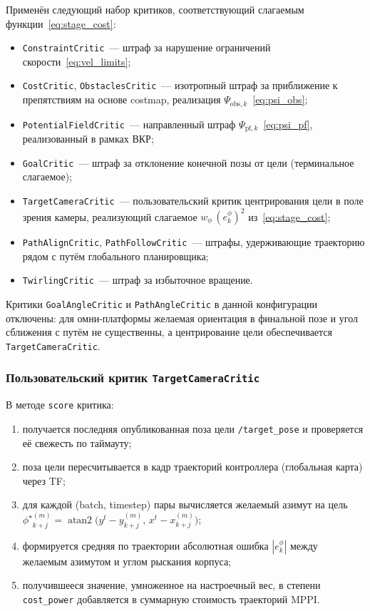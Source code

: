 Применён следующий набор критиков, соответствующий слагаемым
функции~\eqref{eq:stage_cost}:
\begin{itemize}
    \item \texttt{ConstraintCritic}~--- штраф за нарушение ограничений
          скорости~\eqref{eq:vel_limits};
    \item \texttt{CostCritic}, \texttt{ObstaclesCritic}~--- изотропный штраф
          за приближение к препятствиям на основе costmap, реализация
          $\Psi_{\text{obs},k}$~\eqref{eq:psi_obs};
    \item \texttt{PotentialFieldCritic}~--- направленный штраф
          $\Psi_{\text{pf},k}$~\eqref{eq:psi_pf}, реализованный в
          рамках ВКР;
    \item \texttt{GoalCritic}~--- штраф за отклонение конечной позы от
          цели (терминальное слагаемое);
    \item \texttt{TargetCameraCritic}~--- пользовательский критик
          центрирования цели в поле зрения камеры, реализующий
          слагаемое $w_{\phi}\,(e^{\phi}_k)^{2}$ из~\eqref{eq:stage_cost};
    \item \texttt{PathAlignCritic}, \texttt{PathFollowCritic}~--- штрафы,
          удерживающие траекторию рядом с путём глобального планировщика;
    \item \texttt{TwirlingCritic}~--- штраф за избыточное вращение.
\end{itemize}

Критики \texttt{GoalAngleCritic} и \texttt{PathAngleCritic} в данной
конфигурации отключены: для омни-платформы желаемая ориентация в
финальной позе и угол сближения с путём не существенны, а
центрирование цели обеспечивается \texttt{TargetCameraCritic}.

\subsubsection{Пользовательский критик \texttt{TargetCameraCritic}}

В методе \texttt{score} критика:
\begin{enumerate}
    \item получается последняя опубликованная поза цели
          \texttt{/target\_pose} и проверяется её свежесть по таймауту;
    \item поза цели пересчитывается в кадр траекторий контроллера
          (глобальная карта) через TF;
    \item для каждой (batch, timestep) пары вычисляется желаемый
          азимут на цель
          ${\phi^{\star}}^{(m)}_{k+j} = \operatorname{atan2}\bigl(y^{t} - y_{k+j}^{(m)},\,
          x^{t} - x_{k+j}^{(m)}\bigr)$;
    \item формируется средняя по траектории абсолютная ошибка
          $|e^{\phi}_k|$ между желаемым азимутом и углом рыскания
          корпуса;
    \item получившееся значение, умноженное на настроечный вес, в
          степени \texttt{cost\_power} добавляется в суммарную стоимость
          траекторий MPPI.
\end{enumerate}

